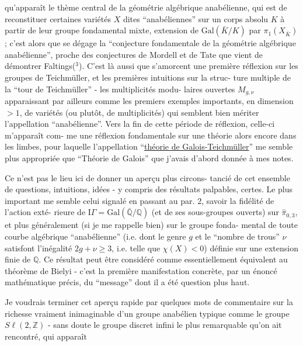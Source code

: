 
qu'apparaît le thème central de la géométrie algébrique anabélienne,
qui est de reconstituer certaines variétés $X$ dites ``anabéliennes''
sur un corps absolu $K$ à partir de leur groupe fondamental mixte,
extension de $\mathrm{Gal}(\bar{K}/K)$ par $\pi_1(X_{\bar{K}})$ ; c'est alors que se dégage la
``conjecture fondamentale de la géométrie algébrique anabélienne'',
proche des conjectures de Mordell et de Tate que vient de démontrer
Faltings($^3$). C'est là aussi que s'amorcent une première réflexion sur
les groupes de Teichmüller, et les premières intuitions sur la struc-%
ture multiple de la ``tour de Teichmüller'' - les multiplicités modu-%
laires ouvertes $M_{g,\nu}$ apparaissant par ailleurs comme les premiers
exemples importants, en dimension $> 1$, de variétés (ou plutôt, de
multiplicités) qui semblent bien mériter l'appellation ``anabélienne''.
Vers la fin de cette période de réflexion, celle-ci m'apparaît com-%
me une réflexion fondamentale sur une théorie alors encore dans les
limbes, pour laquelle l'appellation ``\uline{théorie de Galois-Teichmüller}''
me semble plus appropriée que ``Théorie de Galois'' que j'avais d'abord
donnée à mes notes.

Ce n'est pas le lieu ici de donner un aperçu plus circons-%
tancié de cet ensemble de questions, intuitions, idées - y compris
des résultats palpables, certes. Le plus important me semble celui
signalé en passant au par. 2, savoir la fidélité de l'action exté-%
rieure de $\mathrm{I}\!\Gamma = \mathrm{Gal}(\bar{\mathbb{Q}}/\mathbb{Q})$ (et de ses sous-groupes ouverts) sur $\hat{\pi}_{0,3}$,
et plus généralement (si je me rappelle bien) sur le groupe fonda-%
mental de toute courbe algébrique ``anabélienne'' (i.e. dont le genre
$g$ et le ``nombre de trous'' $\nu$ satisfont l'inégalité $2g + \nu \geq 3$,
i.e. telle que $\chi(X) < 0$) définie sur une extension finie de $\mathbb{Q}$. Ce
résultat peut être considéré comme essentiellement équivalent au
théorème de Bielyi - c'est la première manifestation concrète, par
un énoncé mathématique précis, du ``message'' dont il a été question
plus haut.

Je voudrais terminer cet aperçu rapide par quelques mots
de commentaire sur la richesse vraiment inimaginable d'un groupe
anabélien typique comme le groupe $S\ell(2,\mathbb{Z})$ - sans doute le groupe
discret infini le plus remarquable qu'on ait rencontré, qui apparaît

